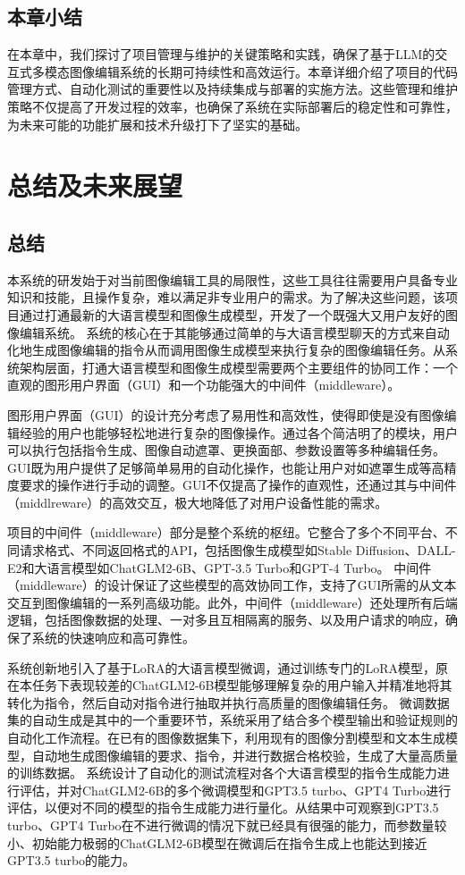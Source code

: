 \documentclass[a4paper,AutoFakeBold,oneside,12pt]{book}
\begin{document}
\section{本章小结}
在本章中，我们探讨了项目管理与维护的关键策略和实践，确保了基于LLM的交互式多模态图像编辑系统的长期可持续性和高效运行。本章详细介绍了项目的代码管理方式、自动化测试的重要性以及持续集成与部署的实施方法。这些管理和维护策略不仅提高了开发过程的效率，也确保了系统在实际部署后的稳定性和可靠性，为未来可能的功能扩展和技术升级打下了坚实的基础。

\chapter{总结及未来展望} %
\section{总结}
本系统的研发始于对当前图像编辑工具的局限性，这些工具往往需要用户具备专业知识和技能，且操作复杂，难以满足非专业用户的需求。为了解决这些问题，该项目通过打通最新的大语言模型和图像生成模型，开发了一个既强大又用户友好的图像编辑系统。
系统的核心在于其能够通过简单的与大语言模型聊天的方式来自动化地生成图像编辑的指令从而调用图像生成模型来执行复杂的图像编辑任务。从系统架构层面，打通大语言模型和图像生成模型需要两个主要组件的协同工作：一个直观的图形用户界面（GUI）和一个功能强大的中间件（middleware）。

图形用户界面（GUI）的设计充分考虑了易用性和高效性，使得即使是没有图像编辑经验的用户也能够轻松地进行复杂的图像操作。通过各个简洁明了的模块，用户可以执行包括指令生成、图像自动遮罩、更换面部、参数设置等多种编辑任务。
GUI既为用户提供了足够简单易用的自动化操作，也能让用户对如遮罩生成等高精度要求的操作进行手动的调整。GUI不仅提高了操作的直观性，还通过其与中间件（middlreware）的高效交互，极大地降低了对用户设备性能的需求。

项目的中间件（middleware）部分是整个系统的枢纽。它整合了多个不同平台、不同请求格式、不同返回格式的API，包括图像生成模型如Stable Diffusion、DALL-E2和大语言模型如ChatGLM2-6B、GPT-3.5 Turbo和GPT-4 Turbo。
中间件（middleware）的设计保证了这些模型的高效协同工作，支持了GUI所需的从文本交互到图像编辑的一系列高级功能。此外，中间件（middleware）还处理所有后端逻辑，包括图像数据的处理、一对多且互相隔离的服务、以及用户请求的响应，确保了系统的快速响应和高可靠性。

系统创新地引入了基于LoRA的大语言模型微调，通过训练专门的LoRA模型，原在本任务下表现较差的ChatGLM2-6B模型能够理解复杂的用户输入并精准地将其转化为指令，然后自动对指令进行抽取并执行高质量的图像编辑任务。
微调数据集的自动生成是其中的一个重要环节，系统采用了结合多个模型输出和验证规则的自动化工作流程。在已有的图像数据集下，利用现有的图像分割模型和文本生成模型，自动地生成图像编辑的要求、指令，并进行数据合格校验，生成了大量高质量的训练数据。
系统设计了自动化的测试流程对各个大语言模型的指令生成能力进行评估，并对ChatGLM2-6B的多个微调模型和GPT3.5 turbo、GPT4 Turbo进行评估，以便对不同的模型的指令生成能力进行量化。从结果中可观察到GPT3.5 turbo、GPT4 Turbo在不进行微调的情况下就已经具有很强的能力，而参数量较小、初始能力极弱的ChatGLM2-6B模型在微调后在指令生成上也能达到接近GPT3.5 turbo的能力。
\end{document}
